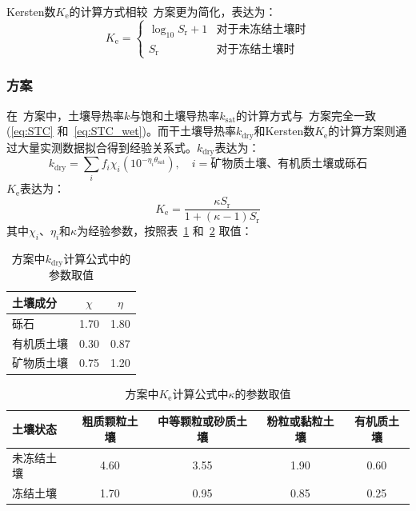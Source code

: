Kersten数$K_{\mathrm {e}} $的计算方式相较~\citet{Johansen1975}方案更为简化，表达为：
\begin{equation}
  K_{\mathrm {e}} =\begin{cases}
    \log_{10}S_{\mathrm {r}} +1 & \text {对于未冻结土壤时} \\
    S_{\mathrm {r}}  & \text {对于冻结土壤时}
  \end{cases}
\end{equation}

\subsubsection{\citet{cote2005}方案}
在~\citet{cote2005}方案中，土壤导热率$k$与饱和土壤导热率$k_{\mathrm{sat}}$的计算方式与~\citet{Johansen1975}方案完全一致 (\eqref{eq:STC} 和~\eqref{eq:STC_wet})。而干土壤导热率$k_{\mathrm{dry}}$和Kersten数$K_{\mathrm {e}} $的计算方案则通过大量实测数据拟合得到经验关系式。$k_{\mathrm{dry}}$表达为：
\begin{equation}\label{eq:STC_dry_CK}
  k_{\mathrm{dry}}=\sum_if_{i} \chi_{i} (10^{-\eta_i\theta_{\mathrm {sat}} }),\quad i=\text{矿物质土壤、有机质土壤或砾石}
\end{equation}
$K_{\mathrm {e}} $表达为：
\begin{equation}
  K_{\mathrm {e}} =\frac{\kappa S_{\mathrm {r}} }{1+(\kappa -1)S_{\mathrm {r}} }
\end{equation}
其中$\chi_i$、$\eta_i$和$\kappa$为经验参数，按照表~\ref{tab:Cote2005方案中k计算参数取值} 和~\ref{tab:Cote2005方案中k计算参数kappa取值} 取值：
\begin{table}[htbp]
  \centering
  \caption{\citet{cote2005}方案中$k_{\mathrm{dry}}$计算公式中的参数取值}
  \label{tab:Cote2005方案中k计算参数取值}
  \begin{tabular}{@{}lcc@{}}
    \toprule
    土壤成分   & $\chi$       & $\eta$             \\
    \midrule
    砾石       & 1.70         & 1.80               \\
    有机质土壤 & 0.30         & 0.87               \\
    矿物质土壤 & 0.75         & 1.20               \\
    \bottomrule
  \end{tabular}
\end{table}
%
\begin{table}[htbp]
  \centering
  \caption{\citet{cote2005}方案中$K_{\mathrm {e}} $计算公式中$\kappa$的参数取值}
  \label{tab:Cote2005方案中k计算参数kappa取值}
  \begin{tabular}{@{}lcccc@{}}
    \toprule
    土壤状态   & 粗质颗粒土壤 & 中等颗粒或砂质土壤  & 粉粒或黏粒土壤 & 有机质土壤 \\
    \midrule
    未冻结土壤 & 4.60         & 3.55                & 1.90           & 0.60       \\
    冻结土壤   & 1.70         & 0.95                & 0.85           & 0.25       \\
    \bottomrule
  \end{tabular}
\end{table}

